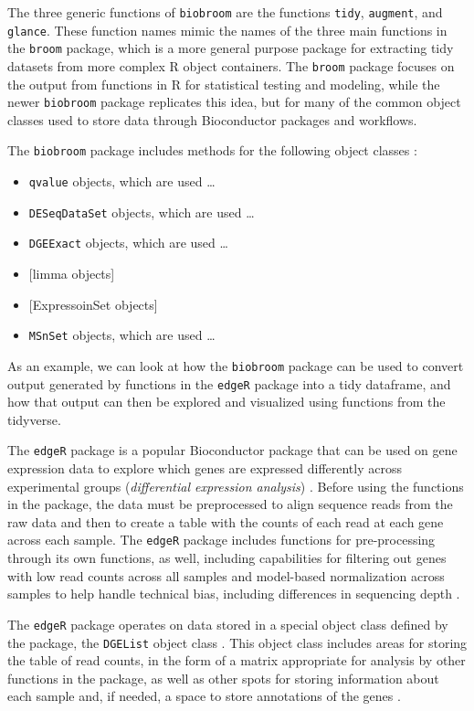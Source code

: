 \documentclass[]{tufte-book}
\providecommand{\tightlist}{%
  \setlength{\itemsep}{0pt}\setlength{\parskip}{0pt}}
\begin{document}
The three generic functions of \texttt{biobroom} are the functions \texttt{tidy}, \texttt{augment},
and \texttt{glance}. These function names mimic the names of the three main functions
in the \texttt{broom} package, which is a more general purpose package for extracting
tidy datasets from more complex R object containers. The \texttt{broom} package
focuses on the output from functions in R for statistical testing and modeling,
while the newer \texttt{biobroom} package replicates this idea, but for many of the
common object classes used to store data through Bioconductor packages and
workflows.

The \texttt{biobroom} package includes methods for the following object classes
\citep{biobroom}:

\begin{itemize}
\tightlist
\item
  \texttt{qvalue} objects, which are used \ldots{}
\item
  \texttt{DESeqDataSet} objects, which are used \ldots{}
\item
  \texttt{DGEExact} objects, which are used \ldots{}
\item
  {[}limma objects{]}
\item
  {[}ExpressoinSet objects{]}
\item
  \texttt{MSnSet} objects, which are used \ldots{}
\end{itemize}

As an example, we can look at how the \texttt{biobroom} package can be used to
convert output generated by functions in the \texttt{edgeR} package into a tidy
dataframe, and how that output can then be explored and visualized using
functions from the tidyverse.

The \texttt{edgeR} package is a popular Bioconductor package that can be used on gene
expression data to explore which genes are expressed differently across
experimental groups (\emph{differential expression analysis}) \citep{edgeR}. Before using
the functions in the package, the data must be preprocessed to align sequence
reads from the raw data and then to create a table with the counts of each read
at each gene across each sample. The \texttt{edgeR} package includes functions for
pre-processing through its own functions, as well, including capabilities for
filtering out genes with low read counts across all samples and model-based
normalization across samples to help handle technical bias, including
differences in sequencing depth \citep{chen2014edger}.

The \texttt{edgeR} package operates on data stored in a special object class
defined by the package, the \texttt{DGEList} object class \citep{chen2014edger}.
This object class includes areas for storing the table of read counts,
in the form of a matrix appropriate for analysis by other functions in
the package, as well as other spots for storing information about each
sample and, if needed, a space to store annotations of the genes
\citep{chen2014edger}.
\end{document}
